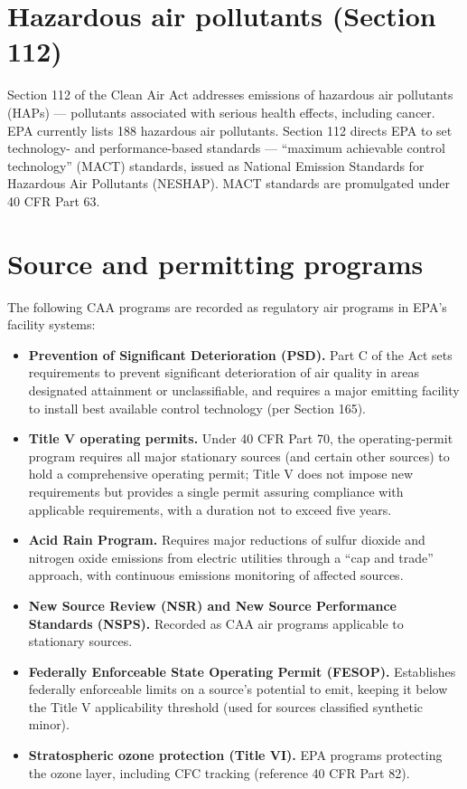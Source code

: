 \documentclass[11pt]{article}
\begin{document}
\section*{Hazardous air pollutants (Section 112)}
Section 112 of the Clean Air Act addresses emissions of hazardous air pollutants (HAPs) --- pollutants
associated with serious health effects, including cancer. EPA currently lists 188 hazardous air
pollutants. Section 112 directs EPA to set technology- and performance-based standards --- ``maximum
achievable control technology'' (MACT) standards, issued as National Emission Standards for Hazardous Air
Pollutants (NESHAP). MACT standards are promulgated under 40 CFR Part 63.

\section*{Source and permitting programs}
The following CAA programs are recorded as regulatory air programs in EPA's facility systems:
\begin{itemize}
  \item \textbf{Prevention of Significant Deterioration (PSD).} Part C of the Act sets requirements to
  prevent significant deterioration of air quality in areas designated attainment or unclassifiable, and
  requires a major emitting facility to install best available control technology (per Section 165).
  \item \textbf{Title V operating permits.} Under 40 CFR Part 70, the operating-permit program requires
  all major stationary sources (and certain other sources) to hold a comprehensive operating permit;
  Title V does not impose new requirements but provides a single permit assuring compliance with
  applicable requirements, with a duration not to exceed five years.
  \item \textbf{Acid Rain Program.} Requires major reductions of sulfur dioxide and nitrogen oxide
  emissions from electric utilities through a ``cap and trade'' approach, with continuous emissions
  monitoring of affected sources.
  \item \textbf{New Source Review (NSR) and New Source Performance Standards (NSPS).} Recorded as CAA air
  programs applicable to stationary sources.
  \item \textbf{Federally Enforceable State Operating Permit (FESOP).} Establishes federally enforceable
  limits on a source's potential to emit, keeping it below the Title V applicability threshold (used for
  sources classified synthetic minor).
  \item \textbf{Stratospheric ozone protection (Title VI).} EPA programs protecting the ozone layer,
  including CFC tracking (reference 40 CFR Part 82).
\end{itemize}
\end{document}
